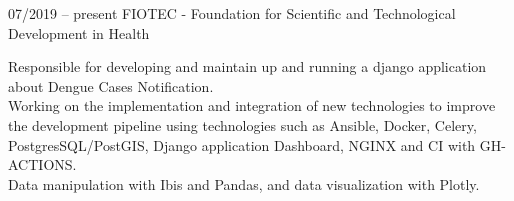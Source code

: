 \documentclass[9pt, green]{./template/developercv} %
\begin{document}
\vspace{-6pt}
\vspace{2.1mm}
\begin{entrylist}
	\entry
	{07/2019 -- present }
	{FIOTEC - Foundation for Scientific and Technological Development in Health}
	{}
	{
		\vspace{0.3mm}
		\begin{minipage}[t]{0.75\textwidth}
			\vspace{-\baselineskip}
			\itemmarker Responsible for developing and maintain up and running a django application about Dengue Cases Notification.\\ 
			\itemmarker Working on the implementation and integration of new technologies to improve the development pipeline using technologies such as Ansible, Docker, Celery, PostgresSQL/PostGIS, Django application Dashboard, NGINX and CI with GH-ACTIONS. \\
			\itemmarker Data manipulation with Ibis and Pandas, and data visualization with Plotly.


\end{minipage}}
\end{entrylist}
\end{document}
